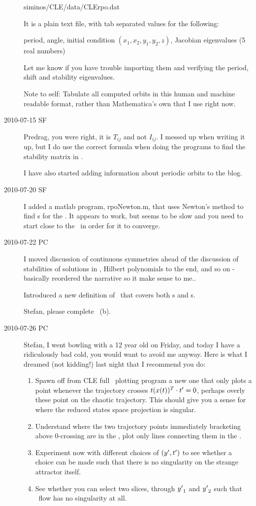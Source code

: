 \begin{description}
siminos/CLE/data/CLErpo.dat

It is a plain text file, with tab separated values for the following:

period, angle, initial condition $(x_1,x_2,y_1,y_2,z)$,
Jacobian eigenvalues (5 real numbers)

Let me know if you have trouble importing them and verifying
the period, shift and stability eigenvalues.

Note to self: Tabulate all computed orbits in this human and machine readable format,
rather than Mathematica's own that I use right now.

\item[2010-07-15 SF]
Predrag, you were right, it is $T_{ij}$ and not $I_{ij}$. I
messed up when writing it up, but I do use the correct
formula when doing the programs to find the stability matrix
in \reducedsp.

I have also started adding information about periodic orbits to the blog.

\item[2010-07-20 SF]
I added a matlab program, rpoNewton.m, that uses Newton's
method to find \rpo s for the \cLe. It appears to work, but
seems to be slow and you need to start close to the \rpo\ in
order for it to converge.


\item[2010-07-22 PC] I moved discussion of continuous
symmetries ahead of the discussion of stabilities of
solutions in , Hilbert polynomials to the
end, and so on - basically reordered the narrative so it make
sense to me..

Introduced a new definition  of \FloquetM\ that covers
both \po s and \rpo s.

Stefan, please complete ~(b).

\item[2010-07-26 PC]
Stefan, I went bowling with a 12 year old on Friday, and
today I have a ridiculously bad cold, you would want to avoid
me anyway. Here is what I dreamed (not kidding!) last night
that I recommend you do:

\begin{enumerate}
    \item
Spawn off from CLE full \statesp\ plotting program a new
one that only plots a point whenever the trajectory crosses
$t(x(t))^T \cdot t'_{} =0$, perhaps overly these point on the chaotic
trajectory. This should give you a sense for where the
reduced states space projection is singular.
    \item
Understand where the two trajectory points immediately
bracketing above 0-crossing are in the \reducedsp,
plot only lines connecting them in the \reducedsp.
    \item
Experiment now with different choices of $({y'},t'_{})$ to see
whether a choice can be made such that there is no
singularity on the strange attractor itself.
    \item
See whether you can select two slices, through ${y'}_1$ and ${y'}_2$
such that \reducedsp\ flow has no singularity at
all.
\end{enumerate}



\end{description}
